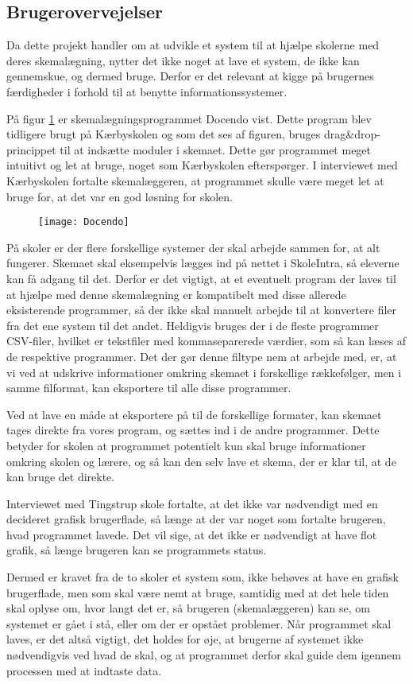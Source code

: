 \subsection{Brugerovervejelser}
Da dette projekt handler om at udvikle et system til at hjælpe skolerne med deres skemalægning, nytter det ikke noget at lave et system, de ikke kan gennemskue, og dermed bruge. Derfor er det relevant at kigge på brugernes færdigheder i forhold til at benytte informationssystemer.

På figur \ref{fig:docendo_skema} er skemalægningsprogrammet Docendo vist. Dette program blev tidligere brugt på Kærbyskolen og som det ses af figuren, bruges drag\&drop-princippet til at indsætte moduler i skemaet. Dette gør programmet meget intuitivt og let at bruge, noget som Kærbyskolen efterspørger. I interviewet med Kærbyskolen fortalte skemalæggeren, at programmet skulle være meget let at bruge for, at det var en god løsning for skolen.

\begin{figure}[h!]
	\centering
	\texttt{[image: Docendo]}
	\label{fig:docendo_skema}
\end{figure}

På skoler er der flere forskellige systemer der skal arbejde sammen for, at alt fungerer. Skemaet skal eksempelvis lægges ind på nettet i SkoleIntra, så eleverne kan få adgang til det. Derfor er det vigtigt, at et eventuelt program der laves til at hjælpe med denne skemalægning er kompatibelt med disse allerede eksisterende programmer, så der ikke skal manuelt arbejde til at konvertere filer fra det ene system til det andet. Heldigvis bruges der i de fleste programmer CSV-filer, hvilket er tekstfiler med kommaseparerede værdier, som så kan læses af de respektive programmer. Det der gør denne filtype nem at arbejde med, er, at vi ved at udskrive informationer omkring skemaet i forskellige rækkefølger, men i samme filformat, kan eksportere til alle disse programmer.

Ved at lave en måde at eksportere på til de forskellige formater, kan skemaet tages direkte fra vores program, og sættes ind i de andre programmer. Dette betyder for skolen at programmet potentielt kun skal bruge informationer omkring skolen og lærere, og så kan den selv lave et skema, der er klar til, at de kan bruge det direkte.

Interviewet med Tingstrup skole fortalte, at det ikke var nødvendigt med en decideret grafisk brugerflade, så længe at der var noget som fortalte brugeren, hvad programmet lavede. Det vil sige, at det ikke er nødvendigt at have flot grafik, så længe brugeren kan se programmets status. 

Dermed er kravet fra de to skoler et system som, ikke behøves at have en grafisk brugerflade, men som skal være nemt at bruge, samtidig med at det hele tiden skal oplyse om, hvor langt det er, så brugeren (skemalæggeren) kan se, om systemet er gået i stå, eller om der er opstået problemer. Når programmet skal laves, er det altså vigtigt, det holdes for øje, at brugerne af systemet ikke nødvendigvis ved hvad de skal, og at programmet derfor skal guide dem igennem processen med at indtaste data.